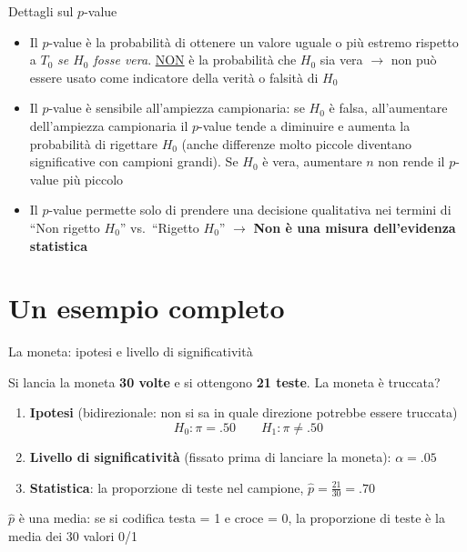 \documentclass[
  ignorenonframetext,
  compress, aspectratio=149]{beamer}
\providecommand{\tightlist}{%
  \setlength{\itemsep}{0pt}\setlength{\parskip}{0pt}}
\begin{document}
\begin{frame}{Dettagli sul \(p\)-value}
\label{dettagli-sul-p-value}
\begin{itemize}
\tightlist
\item
  Il \(p\)-value è la probabilità di ottenere un valore uguale o più
  estremo rispetto a \(T_0\) \emph{se \(H_0\) fosse vera}.
  \underline{NON} è la probabilità che \(H_0\) sia vera \(\rightarrow\)
  non può essere usato come indicatore della verità o falsità di \(H_0\)
\item
  Il \(p\)-value è sensibile all'ampiezza campionaria: se \(H_0\) è
  falsa, all'aumentare dell'ampiezza campionaria il \(p\)-value tende a
  diminuire e aumenta la probabilità di rigettare \(H_0\) (anche
  differenze molto piccole diventano significative con campioni grandi).
  Se \(H_0\) è vera, aumentare \(n\) non rende il \(p\)-value più
  piccolo
\item
  Il \(p\)-value permette solo di prendere una decisione qualitativa nei
  termini di ``Non rigetto \(H_0\)'' vs.~``Rigetto \(H_0\)''
  \(\rightarrow\) \textbf{Non è una misura dell'evidenza statistica}
\end{itemize}
\end{frame}

\section{Un esempio completo}\label{un-esempio-completo}

\begin{frame}{La moneta: ipotesi e livello di significatività}
\label{la-moneta-ipotesi-e-livello-di-significativituxe0}
\small

Si lancia la moneta \textbf{30 volte} e si ottengono \textbf{21 teste}.
La moneta è truccata?

\vspace{2mm}

\begin{enumerate}
\item
  \textbf{Ipotesi} (bidirezionale: non si sa in quale direzione potrebbe
  essere truccata) \[H_0: \pi = .50 \qquad H_1: \pi \neq .50\]
\item
  \textbf{Livello di significatività} (fissato prima di lanciare la
  moneta): \(\alpha = .05\)
\item
  \textbf{Statistica}: la proporzione di teste nel campione,
  \(\hat{p} = \frac{21}{30} = .70\)
\end{enumerate}

\vspace{2mm}

\footnotesize

\(\hat{p}\) è una media: se si codifica testa = 1 e croce = 0, la
proporzione di teste è la media dei 30 valori 0/1
\end{frame}
\end{document}
